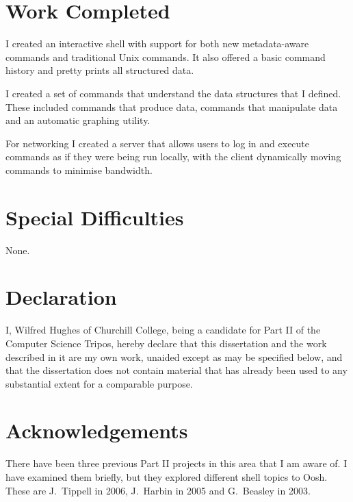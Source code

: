 \documentclass[12pt,twoside,notitlepage]{report}
\begin{document}
\section*{Work Completed}
I created an interactive shell with support for both new metadata-aware
commands and traditional Unix commands. It also offered a basic command
history and pretty prints all structured data.

I created a set of commands that understand the data structures that I
defined. These included commands that produce data, commands that
manipulate data and an automatic graphing utility.

For networking I created a server that allows users to log in and
execute commands as if they were being run locally, with the client
dynamically moving commands to minimise bandwidth.

\section*{Special Difficulties}
None.
 
\newpage
\section*{Declaration}

I, Wilfred Hughes of Churchill College, being a candidate for Part II
of the Computer Science Tripos, hereby declare that this dissertation
and the work described in it are my own work, unaided except as may be
specified below, and that the dissertation does not contain material
that has already been used to any substantial extent for a comparable
purpose.

\bigskip
{}

\medskip
{}

\cleardoublepage

\tableofcontents

\listoffigures

\newpage
\section*{Acknowledgements}

There have been three previous Part II projects in this area that I am
aware of. I have examined them briefly, but they explored different
shell topics to Oosh. These are J.\ Tippell in 2006, J.\ Harbin in
2005 and G.\ Beasley in 2003.

\end{document}
